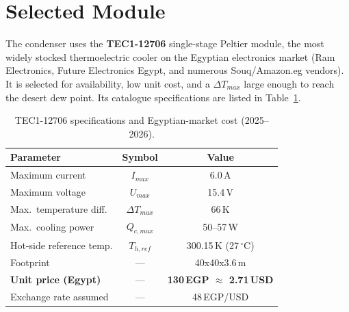 \documentclass[12pt,a4paper]{report}
\newcommand{\SI}[2]{#1\,\mbox{#2}}
\newcommand{\SIrange}[3]{#1--#2\,\mbox{#3}}
\newcommand{\per}{/}
\newcommand{\meter}{m}\newcommand{\metre}{m}
\newcommand{\ampere}{A}\newcommand{\hour}{h}\newcommand{\second}{s}
\newcommand{\volt}{V}\newcommand{\ohm}{\ensuremath{\Omega}}
\newcommand{\kelvin}{K}
\newcommand{\degreeCelsius}{\ensuremath{^{\circ}}C}
\newcommand{\watt}{W}\newcommand{\Wh}{Wh}\newcommand{\kWh}{kWh}
\begin{document}
\section{Selected Module}
The condenser uses the \textbf{TEC1-12706} single-stage Peltier module, the most
widely stocked thermoelectric cooler on the Egyptian electronics market (Ram
Electronics, Future Electronics Egypt, and numerous Souq/Amazon.eg vendors). It
is selected for availability, low unit cost, and a $\Delta T_{max}$ large enough
to reach the desert dew point. Its catalogue specifications are listed in
Table~\ref{tab:tec_specs}.

\begin{table}[H]
  \centering
  \caption{TEC1-12706 specifications and Egyptian-market cost (2025--2026).}
  \label{tab:tec_specs}
  \begin{tabular}{lcc}
    \toprule
    \textbf{Parameter} & \textbf{Symbol} & \textbf{Value}\\
    \midrule
    Maximum current            & $I_{max}$        & \SI{6.0}{\ampere}\\
    Maximum voltage            & $U_{max}$        & \SI{15.4}{\volt}\\
    Max.\ temperature diff.    & $\Delta T_{max}$ & \SI{66}{\kelvin}\\
    Max.\ cooling power        & $Q_{c,max}$      & \SIrange{50}{57}{\watt}\\
    Hot-side reference temp.   & $T_{h,ref}$      & \SI{300.15}{\kelvin} (\SI{27}{\degreeCelsius})\\
    Footprint                  & ---              & \SI{40x40x3.6}{\milli\meter}\\
    \midrule
    \textbf{Unit price (Egypt)} & ---             & \textbf{\SI{130}{EGP} $\approx$ \SI{2.71}{USD}}\\
    Exchange rate assumed       & ---             & \SI{48}{EGP\per USD}\\
    \bottomrule
  \end{tabular}
\end{table}
\end{document}
